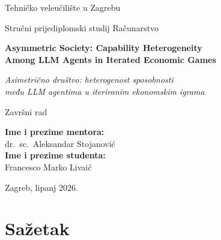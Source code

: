 \begin{titlepage}
    \centering

    {\large Tehničko veleučilište u Zagrebu\par}
    \vspace{0.4em}
    {\large Stručni prijediplomski studij Računarstvo\par}

    \vfill

    {\LARGE\bfseries Asymmetric Society: Capability Heterogeneity\\[0.3em]
    Among LLM Agents in Iterated Economic Games\par}

    \vspace{0.8em}

    {\large\itshape Asimetrično društvo: heterogenost sposobnosti\\[0.2em]
    među LLM agentima u iteriranim ekonomskim igrama\par}

    \vspace{1.0em}

    {\large Završni rad\par}

    \vfill

    \begin{flushright}
        \large
        \textbf{Ime i prezime mentora:}\\
        dr.\ sc.\ Aleksandar Stojanović\\[1.2em]
        \textbf{Ime i prezime studenta:}\\
        Francesco Marko Livaić\\
    \end{flushright}

    \vfill

    {\large Zagreb, lipanj 2026.\par}

\end{titlepage}


\chapter*{Sažetak}

